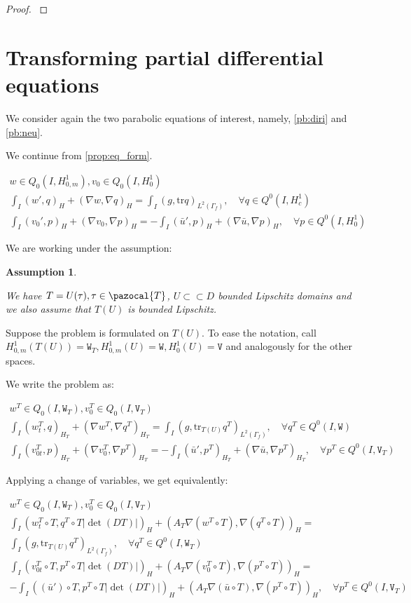 \documentclass[english,a4paper,9pt,oneside]{scrbook}	%
\theoremstyle{break}
\newtheorem{ass}[equation]{Assumption}
\newenvironment{mproof}[1][\proofname]{%
  \begin{proof}[#1]$ $\par\nobreak\ignorespaces
}{%
  \end{proof}
}
\renewcommand*{\proofname}{Proof}
\theoremstyle{remark}
\newcommand{\tr}{\text{tr}}
\newcommand{\cc}{\subset\subset}
\newcommand{\cT}{\pazocal{T}}
\newcommand{\tw}[1]{\texttt{#1}}
\begin{document}
\begin{appendices}
\begin{mproof}
\end{mproof}


\section{Transforming partial differential equations}

We consider again the two parabolic equations of interest, namely, \cref{pb:diri} and \cref{pb:neu}.

We continue from \cref{prop:eq_form}.

\begin{align*}
w \in Q_0(I, H^1_{0,m}), v_0 \in Q_0(I,H^1_0) \\
\int_I ( w' , q)_H+ (\nabla w, \nabla q)_H = \int_I(g,\tr q)_{L^2(\Gamma_f)}, \quad \forall q \in Q^0(I, H^1_c) \\
\int_I (v_0',p)_H + (\nabla v_0, \nabla p)_H= -\int_I(\bar{u}',p)_H+(\nabla \bar{u}, \nabla p)_H, \quad \forall p \in Q^0(I, H^1_0) 
\end{align*}

We are working under the assumption:

\begin{ass}
\label{ass:pull}

We have $T=U(\tau), \tau \in \cT$, $U\cc D$ bounded Lipschitz domains and we also assume that $T(U)$ is bounded Lipschitz.
\end{ass}

Suppose the problem is formulated on $T(U)$. To ease the notation, call $H^1_{0,m}(T(U))=\tw{W}_T, H^1_{0,m}(U)=\tw{W}, H^1_0(U)=\tw{V}$ and analogously for the other spaces.

We write the problem as:

\begin{align*}
w^T \in Q_0(I, \tw{W}_T), v_0^T \in Q_0(I,\tw{V}_T) \\
\int_I  (w^T_t , q)_{H_T}+ (\nabla w^T, \nabla q^T)_{H_T} = \int_I(g,\tr_{T(U)} q^T)_{L^2(\Gamma_f)}, \quad \forall q^T \in Q^0(I, \tw{W}) \\
\int_I (v^T_{0t},p)_{H_T} + (\nabla v_0^T, \nabla p^T)_{H_T}= -\int_I(\bar{u}',p^T)_{H_T}+(\nabla \bar{u}, \nabla p^T)_{H_T}, \quad \forall p^T \in Q^0(I, \tw{V}_T)
\end{align*}

Applying a change of variables, we get equivalently:

\begin{align*}
w^T \in Q_0(I, \tw{W}_T), v_0^T \in Q_0(I,\tw{V}_T) \\
\int_I (w^T_t\circ T, q^T\circ T |\det(DT)|)_H+ (A_T\nabla (w^T\circ T), \nabla( q^T\circ T))_{H} =\\ \int_I(g,\tr_{T(U)} q^T)_{L^2(\Gamma_f)}, \quad \forall q^T \in Q^0(I, \tw{W}_T) \\
\int_I(v_{0t}^T\circ T,p^T\circ T |\det(DT)|)_H + (A_T \nabla (v_0^T\circ T), \nabla( p^T\circ T))_{H}=\\ -\int_I((\bar{u}')\circ T,p^T\circ T |\det(DT)|)_{H}+(A_T \nabla (\bar{u} \circ T), \nabla (p^T\circ T))_{H}, \quad \forall p^T \in Q^0(I, \tw{V}_T)
\end{align*}


\end{appendices}
\end{document}
